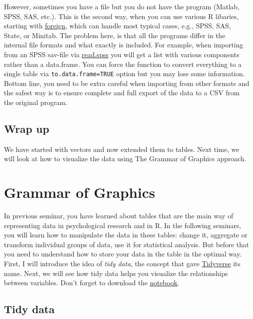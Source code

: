 \documentclass[
]{book}
\begin{document}
However, sometimes you have a file but you do not have the program (Matlab, SPSS, SAS, etc.). This is the second way, when you can use various R libaries, starting with \href{https://www.rdocumentation.org/packages/foreign}{foreign}, which can handle most typical cases, e.g., SPSS, SAS, State, or Minitab. The problem here, is that all the programs differ in the internal file formats and what exactly is included. For example, when importing from an SPSS sav-file via \href{https://www.rdocumentation.org/packages/foreign/versions/0.8-80/topics/read.spss}{read.spss} you will get a list with various components rather than a data.frame. You can force the function to convert everything to a single table via \texttt{to.data.frame=TRUE} option but you may lose some information. Bottom line, you need to be extra careful when importing from other formats and the safest way is to ensure complete and full export of the data to a CSV from the original program.

\hypertarget{wrap-up-1}{%
\section{Wrap up}\label{wrap-up-1}}

We have started with vectors and now extended them to tables. Next time, we will look at how to visualize the data using The Grammar of Graphics approach.

\hypertarget{ggplot2}{%
\chapter{Grammar of Graphics}\label{ggplot2}}

In previous seminar, you have learned about tables that are the main way of representing data in psychological research and in R. In the following seminars, you will learn how to manipulate the data in these tables: change it, aggregate or transform individual groups of data, use it for statistical analysis. But before that you need to understand how to store your data in the table in the optimal way. First, I will introduce the idea of \emph{tidy data}, the concept that gave \href{https://www.tidyverse.org/}{Tidyverse} its name. Next, we will see how tidy data helps you visualize the relationships between variables. Don't forget to download the \href{notebooks/Seminar\%2004\%20-\%20ggplot2.Rmd}{notebook}.

\hypertarget{tidydata}{%
\section{Tidy data}\label{tidydata}}
\end{document}
